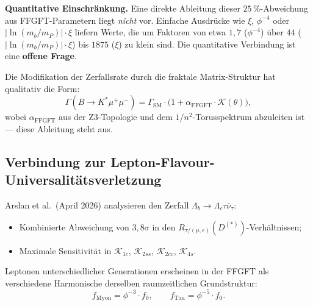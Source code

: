 \begin{warnbox}
\textbf{Quantitative Einschränkung.}
Eine direkte Ableitung dieser $25\,\%$-Abweichung aus FFGFT-Parametern
liegt \emph{nicht} vor. Einfache Ausdrücke wie $\xi$, $\phi^{-4}$ oder
$|\ln(m_b/m_P)|\cdot\xi$ liefern Werte, die um Faktoren von etwa $1{,}7$ ($\phi^{-4}$) über $44$ ($|\ln(m_b/m_P)|\cdot\xi$) bis $1875$ ($\xi$) zu
klein sind. Die quantitative Verbindung ist eine \textbf{offene Frage}.
\end{warnbox}

Die Modifikation der Zerfallsrate durch die fraktale Matrix-Struktur
hat qualitativ die Form:
\begin{equation}
  \Gamma(B\to K^*\mu^+\mu^-)
  = \Gamma_{\text{SM}} \cdot
    \bigl(1 + \alpha_{\text{FFGFT}} \cdot \mathcal{K}(\theta)\bigr),
\end{equation}
wobei $\alpha_{\text{FFGFT}}$ aus der Z3-Topologie und dem
$1/n^2$-Torusspektrum abzuleiten ist — diese Ableitung steht aus.

\subsection{Verbindung zur Lepton-Flavour-Universalitätsverletzung}

Arslan et al.\ (April 2026) \cite{Arslan2026} analysieren den Zerfall
$\Lambda_b \to \Lambda_c\tau\bar{\nu}_\tau$:
\begin{itemize}
  \item Kombinierte Abweichung von $3{,}8\sigma$ in den
        $R_{\tau/(\mu,e)}(D^{(*)})$-Verhältnissen;
  \item Maximale Sensitivität in
        $\mathcal{K}_{1c}$, $\mathcal{K}_{2ss}$, $\mathcal{K}_{2cc}$,
        $\mathcal{K}_{4s}$.
\end{itemize}

Leptonen unterschiedlicher Generationen erscheinen in der FFGFT als
verschiedene Harmonische derselben raumzeitlichen Grundstruktur:
\begin{equation}
  f_{\text{Myon}} = \phi^{-3}\cdot f_0, \qquad
  f_{\text{Tau}}  = \phi^{-5}\cdot f_0.
\end{equation}

